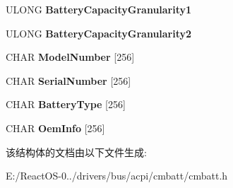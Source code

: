 \begin{DoxyCompactItemize}
U\+L\+O\+NG {\bfseries Battery\+Capacity\+Granularity1}
\item 
\mbox{\label{struct___a_c_p_i___b_i_f___d_a_t_a_ad9439028ec6385565249278a4c4c0050}} 
U\+L\+O\+NG {\bfseries Battery\+Capacity\+Granularity2}
\item 
\mbox{\label{struct___a_c_p_i___b_i_f___d_a_t_a_a6daac810936dd8a9d5b3963ac748ba3c}} 
C\+H\+AR {\bfseries Model\+Number} \mbox{[}256\mbox{]}
\item 
\mbox{\label{struct___a_c_p_i___b_i_f___d_a_t_a_a9e281d10a2e2042fb5abd9c5ff6e1dcd}} 
C\+H\+AR {\bfseries Serial\+Number} \mbox{[}256\mbox{]}
\item 
\mbox{\label{struct___a_c_p_i___b_i_f___d_a_t_a_a10daab1d3d227bda9020fe6d7cb334ba}} 
C\+H\+AR {\bfseries Battery\+Type} \mbox{[}256\mbox{]}
\item 
\mbox{\label{struct___a_c_p_i___b_i_f___d_a_t_a_ae29c29d3571c4eb3377f765356b4e690}} 
C\+H\+AR {\bfseries Oem\+Info} \mbox{[}256\mbox{]}
\end{DoxyCompactItemize}


该结构体的文档由以下文件生成\+:\begin{DoxyCompactItemize}
\item 
E\+:/\+React\+O\+S-\/0../drivers/bus/acpi/cmbatt/cmbatt.\+h\end{DoxyCompactItemize}
